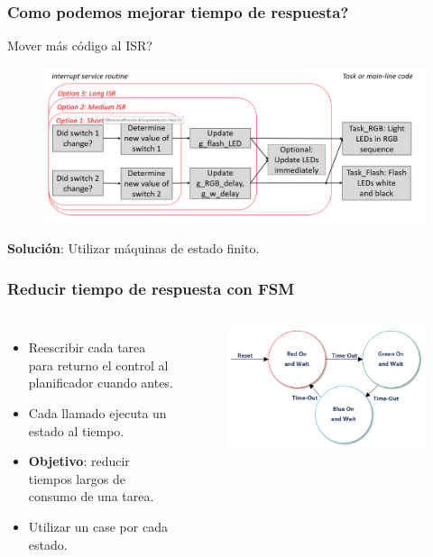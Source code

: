 \documentclass[10.5pt,scale=1.0,t,aspectratio=169,hyperref={pdfpagelabels=false}]{beamer}
\begin{document}
\begin{frame}
	\frametitle{Como podemos mejorar tiempo de respuesta?}
	Mover más código al ISR?
	\begin{figure}
		\centering
		\includegraphics[scale=0.4]{12_MoreISR}
	\end{figure}
	\textbf{Solución}: Utilizar máquinas de estado finito. 
\end{frame}
\begin{frame}
	\frametitle{Reducir tiempo de respuesta con FSM}
	\begin{columns}
		\begin{itemize}
			\item Reescribir cada tarea para returno el control al planificador cuando antes.
			\item Cada llamado ejecuta un estado al tiempo. 
			\item \textbf{Objetivo}: reducir tiempos largos de consumo de una tarea.
			\item Utilizar un case por cada estado. 
		\end{itemize}
		\begin{figure}
			\centering
			\includegraphics[scale=0.4]{13_FSMExample}
		\end{figure}
	\end{columns}
\end{frame}
\end{document}
